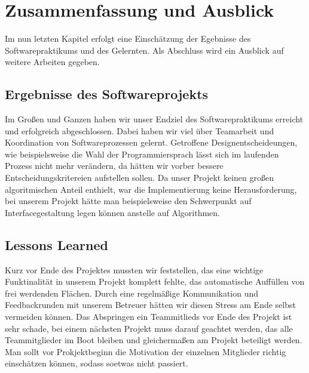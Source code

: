 \section{Zusammenfassung und Ausblick}
\label{sec:zusammenfassung}
Im nun letzten Kapitel erfolgt eine Einschätzung der Egebnisse des Softwarepraktikums und des Gelernten. Als Abschluss wird ein Ausblick auf weitere Arbeiten gegeben.

\subsection{Ergebnisse des Softwareprojekts}
\label{subsec:ergebnisse}

Im Großen und Ganzen haben wir unser Endziel des Softwarepraktikums erreicht und erfolgreich abgeschlossen. Dabei haben wir viel über Teamarbeit und Koordination von Softwareprozessen gelernt. Getroffene Designentscheideungen, wie beispielsweise die Wahl der Programmiersprach lässt sich im laufenden Prozess nicht mehr verändern, da hätten wir vorber bessere Entscheidungskritereien aufstellen sollen. Da unser Projekt keinen großen algoritmischen Anteil enthielt, war die Implementierung keine Herausforderung, bei unserem Projekt hätte man beispielsweise den Schwerpunkt auf Interfacegestaltung legen können anstelle auf Algorithmen.

\subsection{Lessons Learned}
\label{subsec:lessons}

Kurz vor Ende des Projektes mussten wir feststellen, das eine wichtige Funktinalität in unserem Projekt komplett fehlte, das automatische Auffüllen von frei werdenden Flächen. Durch eine regelmäßige Kommunikation und Feedbackrunden mit unserem Betreuer hätten wir diesen Stress am Ende selbst vermeiden können. 
Das Abspringen ein Teammitlieds vor Ende des Projekt ist sehr schade, bei einem nächsten Projekt muss darauf geachtet werden, das alle Teammitglieder im Boot bleiben und gleichermaßen am Projekt beteiligt werden. Man sollt vor Prokjektbeginn die Motivation der einzelnen Mitglieder richtig einschätzen können, sodass soetwas nicht passiert.

